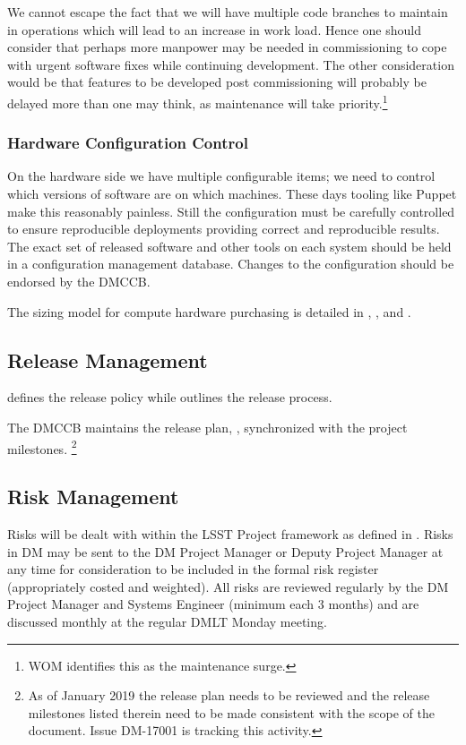 We cannot escape the fact that we  will have multiple code branches to maintain in operations which will lead to an increase in work load.
Hence one should consider that perhaps more manpower may be needed in commissioning to cope with urgent software fixes while continuing development.
The other consideration would be that features to be developed post commissioning will probably be delayed more than one may think, as maintenance will take priority.\footnote{WOM identifies this as the maintenance surge.}

\subsubsection{Hardware Configuration Control}

On the hardware side we have multiple configurable items; we need to control which versions of software are on which machines. These days tooling like Puppet make this reasonably painless. Still the \gls{configuration}  must be carefully controlled to ensure reproducible deployments providing correct and reproducible results. The exact set of released software and other tools on each system should be held in a \gls{configuration} management database.
Changes to the \gls{configuration} should be endorsed by the \gls{DMCCB}.

The sizing model for compute hardware purchasing is detailed in , , and .

\subsection {Release Management } \label{sect:release}

 defines the release policy while  outlines the release process.

The \gls{DMCCB} maintains the release plan, , synchronized with the project milestones.
\footnote{As of January 2019 the release plan needs to be reviewed and the release milestones listed therein need to be made consistent with the scope of the document.
Issue \gls{DM}-17001 is tracking this activity.}



\subsection {Risk Management } \label{sect:risk}

Risks will be dealt with within the \gls{LSST} Project framework as defined in .
Risks in \gls{DM} may be sent to the \gls{DM} \gls{Project Manager} or Deputy \gls{Project Manager} at any time for consideration to be included in the formal risk register (appropriately costed and weighted). All risks are reviewed regularly by the \gls{DM} \gls{Project Manager} and \gls{Systems Engineer} (minimum each 3 months) and are discussed monthly at the regular DMLT Monday meeting.


